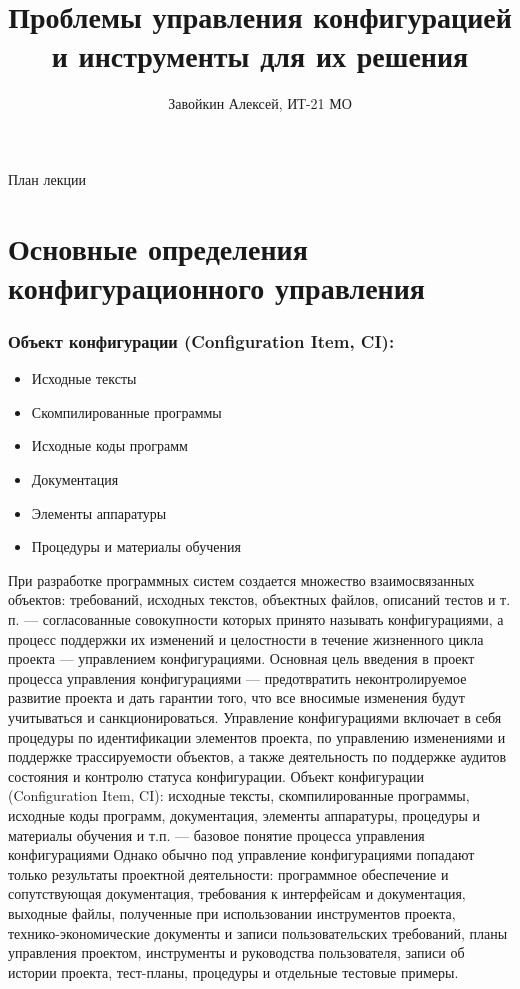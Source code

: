 \documentclass{../industrial-development}
\title{Проблемы управления конфигурацией и инструменты для их решения}
\author{Завойкин Алексей, ИТ-21 МО}
\date{}
\begin{document}
\begin{frame}
  \titlepage
\end{frame}

\begin{frame}{План лекции}
  \tableofcontents
\end{frame}

\section{Основные определения конфигурационного управления}

\begin{frame} \frametitle{Объект конфигурации (Configuration Item, CI):}
  
  \begin{itemize}
\item Исходные тексты
\item Скомпилированные программы
 \item Исходные коды программ
\item Документация
\item Элементы аппаратуры
 \item Процедуры и материалы обучения

  \end{itemize}
\end{frame}

\lecturenotes

При разработке программных систем создается множество взаимосвязанных объектов: требований, исходных текстов, объектных файлов, описаний тестов и т. п. — согласованные совокупности которых принято называть конфигурациями, а процесс поддержки их изменений и целостности в течение жизненного цикла проекта — управлением конфигурациями. Основная цель введения в проект процесса управления конфигурациями — предотвратить неконтролируемое развитие проекта и дать гарантии того, что все вносимые изменения будут учитываться и санкционироваться. Управление конфигурациями включает в себя процедуры по идентификации элементов проекта, по управлению изменениями и поддержке трассируемости объектов, а также деятельность по поддержке аудитов состояния и контролю статуса конфигурации.
Объект конфигурации (Configuration Item, CI): исходные тексты, скомпилированные программы, исходные коды программ, документация, элементы аппаратуры, процедуры и материалы обучения и т.п. — базовое понятие процесса управления конфигурациями Однако обычно под управление конфигурациями попадают только результаты проектной деятельности: программное обеспечение и сопутствующая документация, требования к интерфейсам и документация, выходные файлы, полученные при использовании инструментов проекта, технико-экономические документы и записи пользовательских требований, планы управления проектом, инструменты и руководства пользователя, записи об истории проекта, тест-планы, процедуры и отдельные тестовые примеры.~\cite{Standarts}
\end{document}
